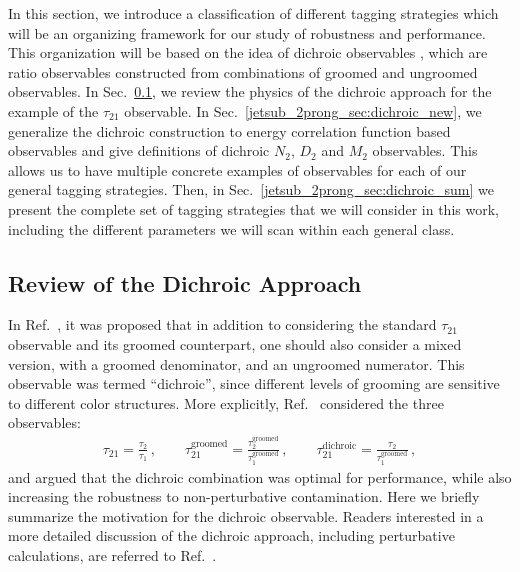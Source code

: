 \documentclass[11pt]{cernrep}
\begin{document}
In this section, we introduce a classification of different tagging strategies which will be an organizing framework for our study of robustness and performance.
%
This organization will be based on the idea of dichroic observables \cite{Salam:2016yht}, which are ratio observables constructed from combinations of groomed and ungroomed observables.
%
In Sec.~\ref{jetsub_2prong_sec:dichroic}, we review the physics of the dichroic approach for the example of the $\tau_{21}$ observable.
%
In Sec.~\ref{jetsub_2prong_sec:dichroic_new}, we generalize the dichroic construction to energy correlation function based observables and give definitions of dichroic $N_2$, $D_2$ and $M_2$ observables.
%
This allows us to have multiple concrete examples of observables for each of our general tagging strategies.
%
Then, in Sec.~\ref{jetsub_2prong_sec:dichroic_sum} we present the complete set of tagging strategies that we will consider in this work, including the different parameters we will scan within each general class.



\subsection{Review of the Dichroic Approach}\label{jetsub_2prong_sec:dichroic}


In Ref.~\cite{Salam:2016yht}, it was proposed that in addition to considering the standard $\tau_{21}$ observable and its groomed counterpart, one should also consider a mixed version, with a groomed denominator, and an ungroomed numerator.
%
This observable was termed ``dichroic'', since different levels of grooming are sensitive to different color structures.
%
More explicitly, Ref.~\cite{Salam:2016yht} considered the three observables:
%
\begin{align}
 \tau_{21} =\frac{\tau_2}{\tau_1}  \,, \qquad \tau_{21}^{\text{groomed}} =\frac{\tau_2^\text{groomed}}{\tau_1^\text{groomed}}\,, \qquad \tau_{21}^{\text{dichroic}} =\frac{\tau_2}{\tau_1^\text{groomed}}\,,
\end{align}
%
and argued that the dichroic combination was optimal for performance, while also increasing the robustness to non-perturbative contamination.
%
Here we briefly summarize the motivation for the dichroic observable.
%
Readers interested in a more detailed discussion of the dichroic approach, including perturbative calculations, are referred to Ref.~\cite{Salam:2016yht}.
\end{document}
